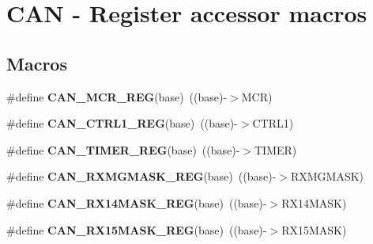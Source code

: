 \hypertarget{group__CAN__Register__Accessor__Macros}{}\section{C\+AN -\/ Register accessor macros}
\label{group__CAN__Register__Accessor__Macros}
\subsection*{Macros}
\begin{DoxyCompactItemize}
\item 
\#define {\bfseries C\+A\+N\+\_\+\+M\+C\+R\+\_\+\+R\+EG}(base)~((base)-\/$>$M\+CR)\hypertarget{group__CAN__Register__Accessor__Macros_gab0b9a78c6ecb2569759f2df7d48247d3}{}\label{group__CAN__Register__Accessor__Macros_gab0b9a78c6ecb2569759f2df7d48247d3}

\item 
\#define {\bfseries C\+A\+N\+\_\+\+C\+T\+R\+L1\+\_\+\+R\+EG}(base)~((base)-\/$>$C\+T\+R\+L1)\hypertarget{group__CAN__Register__Accessor__Macros_ga6858d91c132de14237f524f789306a76}{}\label{group__CAN__Register__Accessor__Macros_ga6858d91c132de14237f524f789306a76}

\item 
\#define {\bfseries C\+A\+N\+\_\+\+T\+I\+M\+E\+R\+\_\+\+R\+EG}(base)~((base)-\/$>$T\+I\+M\+ER)\hypertarget{group__CAN__Register__Accessor__Macros_gafca172705bd196e432969646873ada6a}{}\label{group__CAN__Register__Accessor__Macros_gafca172705bd196e432969646873ada6a}

\item 
\#define {\bfseries C\+A\+N\+\_\+\+R\+X\+M\+G\+M\+A\+S\+K\+\_\+\+R\+EG}(base)~((base)-\/$>$R\+X\+M\+G\+M\+A\+SK)\hypertarget{group__CAN__Register__Accessor__Macros_gaa179231475edb9f872312473a9300f03}{}\label{group__CAN__Register__Accessor__Macros_gaa179231475edb9f872312473a9300f03}

\item 
\#define {\bfseries C\+A\+N\+\_\+\+R\+X14\+M\+A\+S\+K\+\_\+\+R\+EG}(base)~((base)-\/$>$R\+X14\+M\+A\+SK)\hypertarget{group__CAN__Register__Accessor__Macros_ga8519491edf61d4104ce40f321d49e139}{}\label{group__CAN__Register__Accessor__Macros_ga8519491edf61d4104ce40f321d49e139}

\item 
\#define {\bfseries C\+A\+N\+\_\+\+R\+X15\+M\+A\+S\+K\+\_\+\+R\+EG}(base)~((base)-\/$>$R\+X15\+M\+A\+SK)\hypertarget{group__CAN__Register__Accessor__Macros_ga742c3294ee974e1ea04b35e6553bc45b}{}\label{group__CAN__Register__Accessor__Macros_ga742c3294ee974e1ea04b35e6553bc45b}


\end{DoxyCompactItemize}
